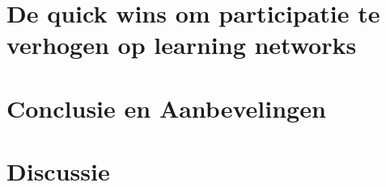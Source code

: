 \documentclass[a4paper, 10pt, pdftex]{report}
\begin{document}
  \newpage
  \chapter{De quick wins om participatie te verhogen op learning networks}
    \newpage

  \newpage
  \chapter*{Conclusie en Aanbevelingen}

  \newpage
  \chapter*{Discussie}

  \listoftables

  \listoffigures


  \newpage
  
  
  \newpage

  \appendix
  \addappheadtotoc
  
  
    \label{navigationappendix}
  
    \label{customtrackingappendix}
  
    \label{enqueteappendix}
  

  
  
\end{document}
